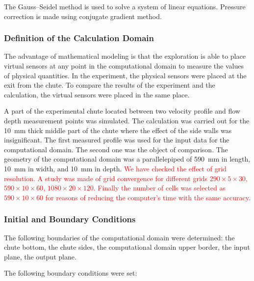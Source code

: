\documentclass[applsci,article,submit,moreauthors,pdftex]{Definitions/mdpi}
\begin{document}
The Gauss–Seidel method is used to solve a system of linear equations. Pressure correction is made using conjugate gradient method.

\subsubsection{Definition of the Calculation Domain}

The advantage of mathematical modeling is that the exploration is able to place virtual sensors at any point in the computational domain to measure the values of physical quantities. In the experiment, the physical sensors were placed at the exit from the chute. To compare the results of the experiment and the calculation, the virtual sensors were placed in the same place.

A part of the experimental chute located between two velocity profile and flow depth measurement points was simulated. The calculation was carried out for the 10~mm thick middle part of the chute where the effect of the side walls was insignificant. The first measured profile was used for the input data for the computational domain. The second one was the object of comparison. The geometry of the computational domain was a parallelepiped of 590~mm in length, 10~mm in width, and 10~mm in depth. \textcolor{red}{We have checked the effect of grid resolution. A study was made of grid convergence for different grids $290 \times 5 \times 30$, $590 \times 10 \times 60$, $1080 \times 20 \times 120$. Finally the number of cells was selected as $590 \times 10 \times 60$ for reasons of reducing the computer's time with the same accuracy}.

\subsubsection{Initial and Boundary Conditions}

The following boundaries of the computational domain were determined: the chute bottom, the chute sides, the computational domain upper border, the input plane, the output plane.

The following boundary conditions were set:
\end{document}
